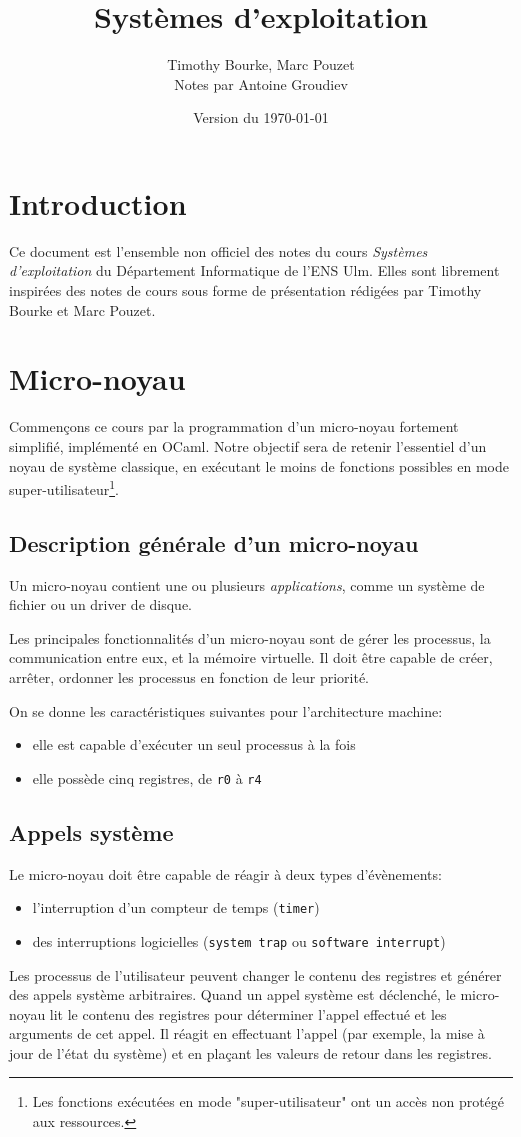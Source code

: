 \documentclass[french, toc]{../cs-classes/cs-classes}
\title{Systèmes d'exploitation}
\author{Timothy Bourke, Marc Pouzet\\ Notes par Antoine Groudiev}
\date{Version du \today}
\begin{document}
\newpage
\section*{Introduction}
Ce document est l'ensemble non officiel des notes du cours \emph{Systèmes d'exploitation} du Département Informatique de l'ENS Ulm. Elles sont librement inspirées des notes de cours sous forme de présentation rédigées par Timothy Bourke et Marc Pouzet.

\section{Micro-noyau}
Commençons ce cours par la programmation d'un micro-noyau fortement simplifié, implémenté en OCaml. Notre objectif sera de retenir l'essentiel d'un noyau de système classique, en exécutant le moins de fonctions possibles en mode super-utilisateur\footnote{Les fonctions exécutées en mode "super-utilisateur" ont un accès non protégé aux ressources.}.

\subsection{Description générale d'un micro-noyau}
Un micro-noyau contient une ou plusieurs \emph{applications}, comme un système de fichier ou un driver de disque.

Les principales fonctionnalités d'un micro-noyau sont de gérer les processus, la communication entre eux, et la mémoire virtuelle. Il doit être capable de créer, arrêter, ordonner les processus en fonction de leur priorité.

On se donne les caractéristiques suivantes pour l'architecture machine:
\begin{itemize}
    \item elle est capable d'exécuter un seul processus à la fois
    \item elle possède cinq registres, de \texttt{r0} à \texttt{r4}
\end{itemize}

\subsection{Appels système}
Le micro-noyau doit être capable de réagir à deux types d'évènements:
\begin{itemize}
    \item l'interruption d'un compteur de temps (\texttt{timer})
    \item des interruptions logicielles (\texttt{system trap} ou \texttt{software interrupt})
\end{itemize}
Les processus de l'utilisateur peuvent changer le contenu des registres et générer des appels système arbitraires. Quand un appel système est déclenché, le micro-noyau lit le contenu des registres pour déterminer l’appel effectué et les arguments de cet appel. Il réagit en effectuant l’appel (par exemple, la mise à jour de l’état du système) et en plaçant les valeurs de retour dans les registres.
\end{document}
